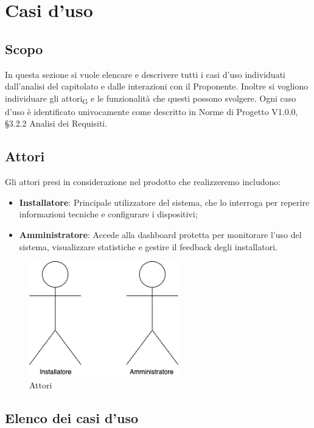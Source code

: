 \section{Casi d'uso}
\subsection{Scopo}
In questa sezione si vuole elencare e descrivere tutti i casi d'uso individuati dall'analisi del capitolato e dalle interazioni con il Proponente. Inoltre si vogliono individuare gli attori\textsubscript{G} e le funzionalità che questi possono svolgere. Ogni caso d'uso è identificato univocamente come descritto in Norme di Progetto V1.0.0,  §3.2.2 Analisi dei Requisiti.

\subsection{Attori}
Gli attori presi in considerazione nel prodotto che realizzeremo includono:
\begin{itemize}
    \item \textbf{Installatore}: Principale utilizzatore del sistema, che lo interroga per reperire informazioni tecniche e configurare i dispositivi; 
    \item \textbf{Amministratore}: Accede alla dashboard protetta per monitorare l’uso del sistema, visualizzare statistiche e gestire il feedback degli installatori.
\end{itemize}
\begin{figure}[H]
\centering
\includegraphics[height=5cm]{contents/casi_duso/png/attori.png}
\caption{Attori}
\end{figure}

\subsection{Elenco dei casi d'uso}
